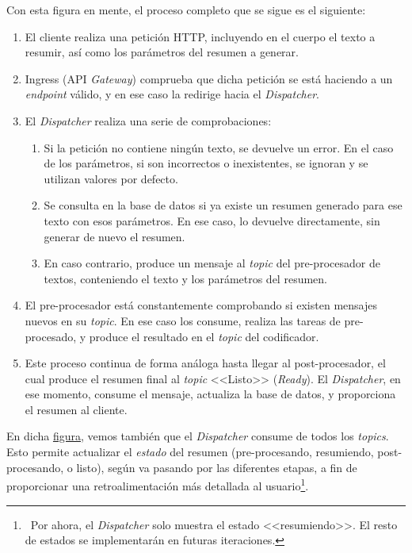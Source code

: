 Con esta figura en mente, el proceso completo que se sigue es el siguiente:

\begin{enumerate}
	\item El cliente realiza una petición HTTP, incluyendo en el cuerpo el texto a resumir, así como los parámetros del resumen a generar.
	
	\item Ingress (API \emph{Gateway}) comprueba que dicha petición se está haciendo a un \emph{endpoint} válido, y en ese caso la redirige hacia el \emph{Dispatcher}.
	
	\item El \emph{Dispatcher} realiza una serie de comprobaciones:
	\begin{enumerate}
		\item Si la petición no contiene ningún texto, se devuelve un error. En el caso de los parámetros, si son incorrectos o inexistentes, se ignoran y se utilizan valores por defecto.
		
		\item Se consulta en la base de datos si ya existe un resumen generado para ese texto con esos parámetros. En ese caso, lo devuelve directamente, sin generar de nuevo el resumen.
		
		\item En caso contrario, produce un mensaje al \emph{topic} del pre-procesador de textos, conteniendo el texto y los parámetros del resumen.
	\end{enumerate}

	\item El pre-procesador está constantemente comprobando si existen mensajes nuevos en su \emph{topic}. En ese caso los consume, realiza las tareas de pre-procesado, y produce el resultado en el \emph{topic} del codificador.
	
	\item Este proceso continua de forma análoga hasta llegar al post-procesador, el cual produce el resumen final al \emph{topic} <<Listo>> (\emph{Ready}). El \emph{Dispatcher}, en ese momento, consume el mensaje, actualiza la base de datos, y proporciona el resumen al cliente.
\end{enumerate}

En dicha \hyperref[fig:overview-arch-2]{figura}, vemos también que el \emph{Dispatcher} consume de todos los \emph{topics}. Esto permite actualizar el \emph{estado} del resumen (pre-procesando, resumiendo, post-procesando, o listo), según va pasando por las diferentes etapas, a fin de proporcionar una retroalimentación más detallada al usuario\footnote{\, Por ahora, el \emph{Dispatcher} solo muestra el estado <<resumiendo>>. El resto de estados se implementarán en futuras iteraciones.}.


